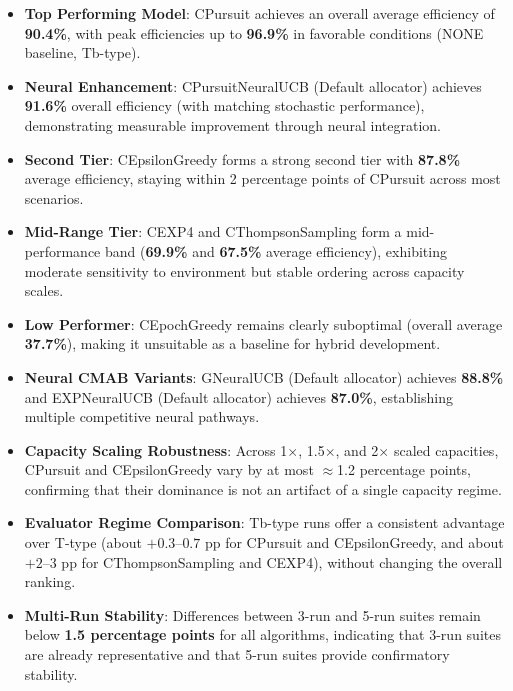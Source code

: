 \documentclass[12pt,a4paper]{article}
\newcommand{\performance}[1]{\textcolor{performancecolor}{\textbf{#1}}}
\newcommand{\critical}[1]{\textcolor{criticalcolor}{\textbf{#1}}}
\newcommand{\success}[1]{\textcolor{successcolor}{\textbf{#1}}}
\newcommand{\neural}[1]{\textcolor{neuralcolor}{\textbf{#1}}}
\begin{document}
\begin{tcolorbox}[colback=highlightcolor!30,colframe=performancecolor,title=\textbf{Key Experimental Results Summary (3-run/5-run, 1$\times$–2$\times$ Capacities, T/Tb Regimes)}]
\begin{itemize}
\item \performance{Top Performing Model}: CPursuit achieves an overall average efficiency of \textbf{90.4\%}, with peak efficiencies up to \textbf{96.9\%} in favorable conditions (NONE baseline, Tb-type).
\item \neural{Neural Enhancement}: CPursuitNeuralUCB (Default allocator) achieves \textbf{91.6\%} overall efficiency (with matching stochastic performance), demonstrating measurable improvement through neural integration.
\item \performance{Second Tier}: CEpsilonGreedy forms a strong second tier with \textbf{87.8\%} average efficiency, staying within 2 percentage points of CPursuit across most scenarios.
\item \performance{Mid-Range Tier}: CEXP4 and CThompsonSampling form a mid-performance band (\textbf{69.9\%} and \textbf{67.5\%} average efficiency), exhibiting moderate sensitivity to environment but stable ordering across capacity scales.
\item \critical{Low Performer}: CEpochGreedy remains clearly suboptimal (overall average \textbf{37.7\%}), making it unsuitable as a baseline for hybrid development.
\item \neural{Neural CMAB Variants}: GNeuralUCB (Default allocator) achieves \textbf{88.8\%} and EXPNeuralUCB (Default allocator) achieves \textbf{87.0\%}, establishing multiple competitive neural pathways.
\item \success{Capacity Scaling Robustness}: Across 1$\times$, 1.5$\times$, and 2$\times$ scaled capacities, CPursuit and CEpsilonGreedy vary by at most $\approx$1.2 percentage points, confirming that their dominance is not an artifact of a single capacity regime.
\item \success{Evaluator Regime Comparison}: Tb-type runs offer a consistent advantage over T-type (about $+0.3$–$0.7$ pp for CPursuit and CEpsilonGreedy, and about $+2$–$3$ pp for CThompsonSampling and CEXP4), without changing the overall ranking.
\item \success{Multi-Run Stability}: Differences between 3-run and 5-run suites remain below \textbf{1.5 percentage points} for all algorithms, indicating that 3-run suites are already representative and that 5-run suites provide confirmatory stability.
\end{itemize}
\end{tcolorbox}
\end{document}
